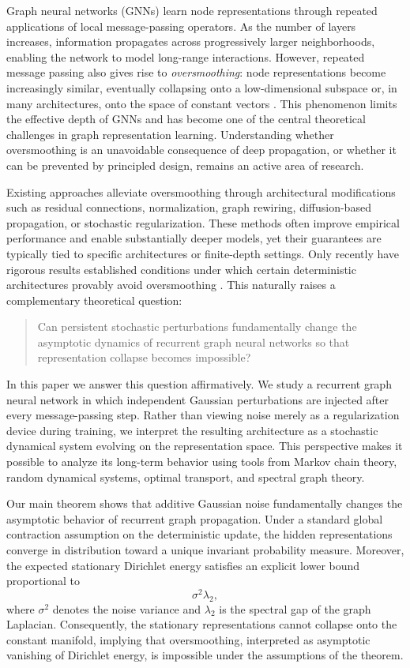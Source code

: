 \documentclass{article}
\begin{document}
Graph neural networks (GNNs) learn node representations through repeated
applications of local message-passing operators.
As the number of layers increases, information propagates across
progressively larger neighborhoods, enabling the network to model
long-range interactions.
However, repeated message passing also gives rise to
\emph{oversmoothing}: node representations become increasingly similar,
eventually collapsing onto a low-dimensional subspace or, in many
architectures, onto the space of constant vectors
\cite{li2018deeper,oono2020graph}.
This phenomenon limits the effective depth of GNNs and has become one of
the central theoretical challenges in graph representation learning.
Understanding whether oversmoothing is an unavoidable consequence of
deep propagation, or whether it can be prevented by principled design,
remains an active area of research.

Existing approaches alleviate oversmoothing through architectural
modifications such as residual connections, normalization,
graph rewiring, diffusion-based propagation, or stochastic
regularization.
These methods often improve empirical performance and enable
substantially deeper models, yet their guarantees are typically tied to
specific architectures or finite-depth settings.
Only recently have rigorous results established conditions under which
certain deterministic architectures provably avoid oversmoothing
\cite{scholkemper2025}.
This naturally raises a complementary theoretical question:

\begin{quote}
	Can persistent stochastic perturbations fundamentally change the
	asymptotic dynamics of recurrent graph neural networks so that
	representation collapse becomes impossible?
\end{quote}

In this paper we answer this question affirmatively.
We study a recurrent graph neural network in which independent Gaussian
perturbations are injected after every message-passing step.
Rather than viewing noise merely as a regularization device during
training, we interpret the resulting architecture as a stochastic
dynamical system evolving on the representation space.
This perspective makes it possible to analyze its long-term behavior
using tools from Markov chain theory, random dynamical systems,
optimal transport, and spectral graph theory.

Our main theorem shows that additive Gaussian noise fundamentally changes
the asymptotic behavior of recurrent graph propagation.
Under a standard global contraction assumption on the deterministic
update, the hidden representations converge in distribution toward a
unique invariant probability measure.
Moreover, the expected stationary Dirichlet energy satisfies an explicit
lower bound proportional to
\[
\sigma^2\lambda_2,
\]
where $\sigma^2$ denotes the noise variance and $\lambda_2$ is the
spectral gap of the graph Laplacian.
Consequently, the stationary representations cannot collapse onto the
constant manifold, implying that oversmoothing, interpreted as
asymptotic vanishing of Dirichlet energy, is impossible under the
assumptions of the theorem.
\end{document}
